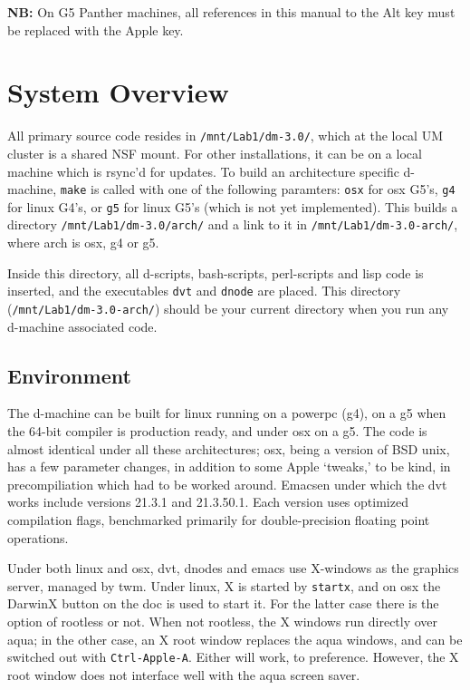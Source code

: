 \documentclass[12pt]{article}
\begin{document}
\textbf{NB:} On G5 Panther machines, all references in this manual to
the Alt key must be replaced with the Apple key.

\section{System Overview}
\label{sec:overview}

All primary source code resides in \texttt{/mnt/Lab1/dm-3.0/}, which
at the local UM cluster is a shared NSF mount.  For other
installations, it can be on a local machine which is rsync'd for
updates. To build an architecture specific d-machine, \verb$make$ is
called with one of the following paramters: \verb$osx$ for osx G5's,
\verb$g4$ for linux G4's, or \verb$g5$ for linux G5's (which is not
yet implemented).  This builds a directory \texttt{/mnt/Lab1/dm-3.0/arch/}
and a link to it in \texttt{/mnt/Lab1/dm-3.0-arch/}, where arch is
osx, g4 or g5.

Inside this directory, all d-scripts, bash-scripts, perl-scripts and
lisp code is inserted, and the executables \texttt{dvt} and
\texttt{dnode} are placed.  This directory
(\texttt{/mnt/Lab1/dm-3.0-arch/}) should be your current directory
when you run any d-machine associated code.

\subsection{Environment}
\label{sec:env}

The d-machine can be built for linux running on a powerpc (g4), on a
g5 when the 64-bit compiler is production ready, and under osx on a
g5. The code is almost identical under all these architectures; osx,
being a version of BSD unix, has a few parameter changes, in addition
to some Apple `tweaks,' to be kind, in precompiliation which had to be
worked around. Emacsen under which the dvt works include versions
21.3.1 and 21.3.50.1. Each version uses optimized compilation flags,
benchmarked primarily for double-precision floating point operations.

Under both linux and osx, dvt, dnodes and emacs use X-windows as the
graphics server, managed by twm.  Under linux, X is started by
\verb$startx$, and on osx the DarwinX button on the doc is used to
start it. For the latter case there is the option of rootless or
not. When not rootless, the X windows run directly over aqua; in the
other case, an X root window replaces the aqua windows, and can be
switched out with \verb$Ctrl-Apple-A$.  Either will work, to preference.
However, the X root window does not interface well with the aqua
screen saver.
\end{document}
